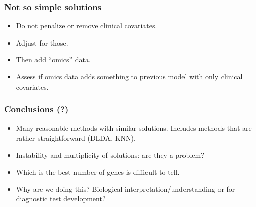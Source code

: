 \begin{frame}
\frametitle{Not so simple solutions}
\begin{itemize}
\item Do not penalize or remove clinical covariates.
\item Adjust for those.
\item Then add ``omics'' data.
\item Assess if omics data adds something to previous model with only
  clinical covariates.
\end{itemize}


\end{frame}



\begin{frame}
\frametitle{Conclusions (?)}
\begin{itemize}
\item Many reasonable methods with similar solutions. Includes methods
  that are rather straightforward (DLDA, KNN).
\item Instability and multiplicity of solutions: are they a problem?
\item Which is the best number of genes is difficult to tell.
\item Why are we doing this? Biological interpretation/understanding or
  for diagnostic test development?
\end{itemize}
\end{frame}





